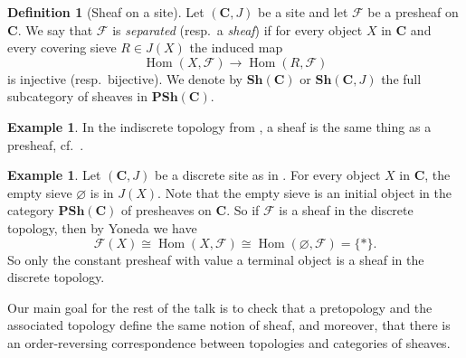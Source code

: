 \documentclass[12pt,reqno,a4paper]{amsart}
\theoremstyle{plain}
\theoremstyle{definition}
\newtheorem{defn}[thm]{Definition}
\newtheorem{exmp}[thm]{Example}
\theoremstyle{remark}
\begin{document}
\begin{defn}[Sheaf on a site]
  Let $(\mathbf{C},J)$ be a site and let $\mathscr{F}$ be a presheaf on $\mathbf{C}$.
  We say that $\mathscr{F}$ is \textit{separated} (resp.~a \textit{sheaf}) if for every object $X$ in $\mathbf{C}$ and every covering sieve $R \in J(X)$ the induced map
  \[ \operatorname{Hom}(X,\mathscr{F}) \to \operatorname{Hom}(R,\mathscr{F}) \]
  is injective (resp.~bijective).
  We denote by $\mathbf{Sh}(\mathbf{C})$ or $\mathbf{Sh}(\mathbf{C},J)$ the full subcategory of sheaves in $\mathbf{PSh}(\mathbf{C})$.
\end{defn}

\begin{exmp}\label{exmp:indiscretesheaf}
  In the indiscrete topology from , a sheaf is the same thing as a presheaf, cf.~.
\end{exmp}

\begin{exmp}\label{exmp:discretesheaf}
  Let $(\mathbf{C},J)$ be a discrete site as in .
  For every object $X$ in $\mathbf{C}$, the empty sieve $\varnothing$ is in $J(X)$.
  Note that the empty sieve is an initial object in the category $\mathbf{PSh}(\mathbf{C})$ of presheaves on $\mathbf{C}$.
  So if $\mathscr{F}$ is a sheaf in the discrete topology, then by Yoneda we have
  \[ \mathscr{F}(X) \cong \operatorname{Hom}(X,\mathscr{F}) \cong \operatorname{Hom}(\varnothing, \mathscr{F}) = \{ * \}. \]
  So only the constant presheaf with value a terminal object is a sheaf in the discrete topology.
\end{exmp}

Our main goal for the rest of the talk is to check that a pretopology and the associated topology define the same notion of sheaf, and moreover, that there is an order-reversing correspondence between topologies and categories of sheaves.
\end{document}
